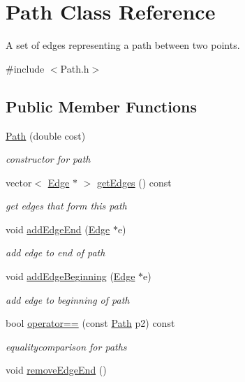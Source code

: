 \hypertarget{class_path}{}\section{Path Class Reference}
\label{class_path}


A set of edges representing a path between two points.  




{\ttfamily \#include $<$Path.\+h$>$}

\subsection*{Public Member Functions}
\begin{DoxyCompactItemize}
\item 
\hyperlink{class_path_ad2c6ad256aaa8f14e04a454e5690c961}{Path} (double cost)
\begin{DoxyCompactList}\small\item\em constructor for path \end{DoxyCompactList}\item 
vector$<$ \hyperlink{class_edge}{Edge} $\ast$ $>$ \hyperlink{class_path_a71778fdc2ff927535b0701d9064f7648}{get\+Edges} () const 
\begin{DoxyCompactList}\small\item\em get edges that form this path \end{DoxyCompactList}\item 
void \hyperlink{class_path_a3422b044fb9e5a713949278627ee1a9e}{add\+Edge\+End} (\hyperlink{class_edge}{Edge} $\ast$e)
\begin{DoxyCompactList}\small\item\em add edge to end of path \end{DoxyCompactList}\item 
void \hyperlink{class_path_a21f45a6d06681e5dc1b55f70bfdb877e}{add\+Edge\+Beginning} (\hyperlink{class_edge}{Edge} $\ast$e)
\begin{DoxyCompactList}\small\item\em add edge to beginning of path \end{DoxyCompactList}\item 
bool \hyperlink{class_path_ab1a846eee63b13e03724965d12d0a501}{operator==} (const \hyperlink{class_path}{Path} p2) const 
\begin{DoxyCompactList}\small\item\em equalitycomparison for paths \end{DoxyCompactList}\item 
\hypertarget{class_path_a8db20815826ef0f30515cb9e5c415da4}{}void \hyperlink{class_path_a8db20815826ef0f30515cb9e5c415da4}{remove\+Edge\+End} ()\label{class_path_a8db20815826ef0f30515cb9e5c415da4}


\end{DoxyCompactItemize}
